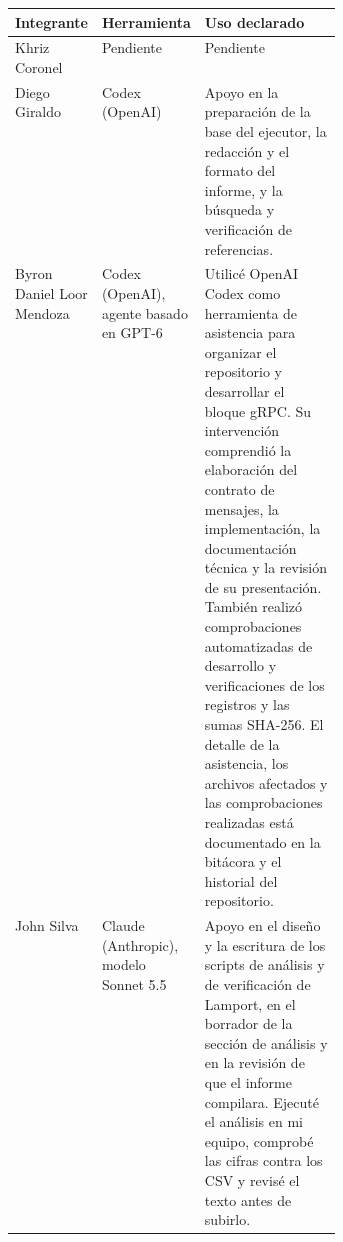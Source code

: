 \documentclass[11pt,a4paper]{article}
\begin{document}
\noindent
\begin{tabularx}{\linewidth}{|>{\raggedright\arraybackslash}p{0.17\linewidth}|>{\raggedright\arraybackslash}p{0.21\linewidth}|>{\raggedright\arraybackslash}X|}
\hline
\textbf{Integrante} & \textbf{Herramienta} & \textbf{Uso declarado} \\
\hline
Khriz Coronel & Pendiente & Pendiente \\
\hline
Diego Giraldo & Codex (OpenAI) &
Apoyo en la preparación de la base del ejecutor, la redacción y el formato del informe, y la búsqueda y verificación de referencias. \\
\hline
Byron Daniel Loor Mendoza & Codex (OpenAI), agente basado en GPT-6 &
Utilicé OpenAI Codex como herramienta de asistencia para organizar el
repositorio y desarrollar el bloque gRPC. Su intervención comprendió la
elaboración del contrato de mensajes, la implementación, la documentación
técnica y la revisión de su presentación. También realizó comprobaciones
automatizadas de desarrollo y verificaciones de los registros y las sumas
SHA-256. El detalle de la asistencia, los archivos afectados y las
comprobaciones realizadas está documentado en la bitácora y el historial
del repositorio. \\
\hline
John Silva & Claude (Anthropic), modelo Sonnet 5.5 &
Apoyo en el diseño y la escritura de los scripts de análisis y de verificación de Lamport, en el borrador de la sección de análisis y en la revisión de que el informe compilara. Ejecuté el análisis en mi equipo, comprobé las cifras contra los CSV y revisé el texto antes de subirlo. \\
\hline
\end{tabularx}


\printbibliography
\end{document}
